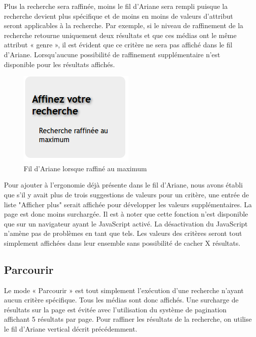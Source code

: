\documentclass[letter, 11pt]{report}
\begin{document}
Plus la recherche sera raffinée, moins le fil d'Ariane sera rempli puisque la recherche devient plus spécifique et de moins en moins de valeurs d'attribut seront applicables à la recherche. Par exemple, si le niveau de raffinement de la recherche retourne uniquement deux résultats et que ces médias ont le même attribut « genre », il est évident que ce critère ne sera pas affiché dans le fil d'Ariane. Lorsqu’aucune possibilité de raffinement supplémentaire n’est disponible pour les résultats affichés. 

\begin{figure}[htbp]
	\begin{center}
		\includegraphics[scale=0.5]{captures_ecran/recherche_rafinnee_au_max.png}
	\end{center}
	\caption{Fil d'Ariane lorsque raffiné au maximum}
\end{figure}

Pour ajouter à l'ergonomie déjà présente dans le fil d'Ariane, nous avons établi que s'il y avait plus de trois suggestions de valeurs pour un critère, une entrée de liste "Afficher plus" serait affichée pour développer les valeurs supplémentaires. La page est donc moins surchargée. Il est à noter que cette fonction n'est disponible que sur un navigateur ayant le JavaScript activé. La désactivation du JavaScript n'amène pas de problèmes en tant que tels. Les valeurs des critères seront tout simplement affichées dans leur ensemble sans possibilité de cacher X résultats.

\subsection{Parcourir}
Le mode « Parcourir » est tout simplement l'exécution d'une recherche n'ayant aucun critère spécifique. Tous les médias sont donc affichés. Une surcharge de résultats sur la page est évitée avec l'utilisation du système de pagination affichant 5 résultats par page. Pour raffiner les résultats de la recherche, on utilise le fil d'Ariane vertical décrit précédemment.
\end{document}

